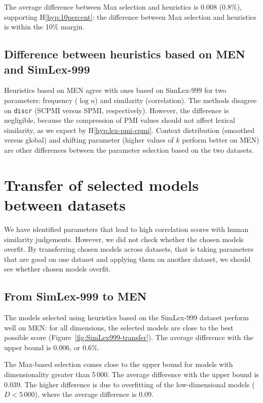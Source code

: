 The average difference between Max selection and heuristics is 0.008 (0.8\%), supporting H\ref{hyp:10percent}: the difference between Max selection and heuristics is within the 10\% margin.

\subsection{Difference between heuristics based on MEN and SimLex-999}

Heuristics based on MEN agree with ones based on SimLex-999 for two parameters: frequency ($\log n$) and similarity (correlation). The methods disagree on \texttt{discr} (SCPMI versus SPMI, respectively). However, the difference is negligible, because the compression of PMI values should not affect lexical similarity, as we expect by H\ref{hyp:lex-pmi-cpmi}. Context distribution (smoothed versus global) and shifting parameter (higher values of $k$ perform better on MEN) are other differences between the parameter selection based on the two datasets.

\section{Transfer of selected models between datasets}
\label{sec:select-model-transf}

We have identified parameters that lead to high correlation scores with human similarity judgements. However, we did not check whether the chosen models overfit. By transferring chosen models across datasets, that is taking parameters that are good on one dataset and applying them on another dataset, we should see whether chosen models overfit. 

\subsection{From SimLex-999 to MEN}
\label{sec:simlex-men}



The models selected using heuristics based on the SimLex-999 dataset perform well on MEN: for all dimensions, the selected models are close to the best possible score (Figure~\ref{fig:SimLex999-transfer}). The average difference with the upper bound is 0.006, or 0.6\%.

The Max-based selection comes close to the upper bound for models with dimensionality greater than 5\,000. The average difference with the upper bound is 0.039. The higher difference is due to overfitting of the low-dimensional models ($D < 5\,000$), where the average difference is 0.09.

